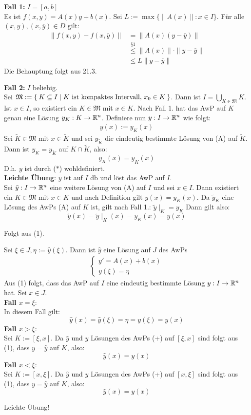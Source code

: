 \documentclass[a4paper,oneside,DIV15,BCOR12mm,chapterprefix=true,headings=onelinechapter]{scrbook}
\begin{document}
\begin{beweise}
\item \textbf{Fall 1:} $I=[a,b]$\\
Es ist $f(x,y)=A(x)y+b(x)$. Sei $L:=\max\{\|A(x)\|:x\in I\}$. Für alle $(x,y),(x,\overline y)\in D$ gilt:
\begin{align*}
\|f(x,y)-f(x,\overline y) \| &=\|A(x)(y-\overline y)\|\\
&\stackrel{\text{§1}}{\le} \|A(x)\|\cdot\|y-\overline y\|\\
&\le L\|y-\overline y\|
\end{align*}
Die Behauptung folgt aus 21.3.

\textbf{Fall 2:} $I$ beliebig.\\
Sei $\mathfrak{M}:=\Set{K\subseteq I | K\text{ ist kompaktes Intervall, } x_0\in K}$.
Dann ist $I=\bigcup_{K\in\mathfrak{M}} K$.\\
Ist $x\in I$, so existiert ein $K\in\mathfrak{M}$ mit $x\in K$. Nach Fall 1. hat das
AwP auf $K$ genau eine Lösung $y_K:K\to\mathbb{R}^n$. Definiere nun $y:I\to\mathbb{R}^n$ wie folgt:
\begin{align}
y(x):=y_K(x)\tag{$*$}
\end{align}
Sei $\tilde K\in\mathfrak{M}$ mit $x\in\tilde K$ und sei $y_{\tilde K}$ die eindeutig
bestimmte Lösung von (A) auf $\tilde K$. Dann ist $y_K=y_{\tilde K}$ auf $K\cap\tilde K$, also:
\[y_K(x)=y_{\tilde K}(x)\]
D.h. $y$ ist durch ($*$) wohldefiniert.\\
\textbf{Leichte Übung}: $y$ ist auf $I$ db und löst das AwP auf $I$.\\
Sei $\tilde y:I\to\mathbb{R}^n$ eine weitere Lösung von (A) auf $I$ und sei $x\in I$.
Dann existiert ein $K\in\mathfrak{M}$ mit $x\in K$ und nach Definition gilt $y(x)=y_K(x)$.
Da $\tilde y_K$ eine Lösung des AwPs (A) auf $K$ ist, gilt nach Fall 1.: $\tilde y\mid_K=y_K$
Dann gilt also:
\[\tilde y(x)=\tilde y\mid_K(x)=y_K(x)=y(x)\]
\item Folgt aus (1).
\item Sei $\xi \in J,\eta:=\hat y(\xi)$. Dann ist $\hat y$ eine Lösung auf $J$ des AwPs
\begin{align*}
\tag{+}
\begin{cases}
y'=A(x)+b(x)\\
y(\xi)=\eta
\end{cases}
\end{align*}
Aus (1) folgt, dass das AwP auf $I$ eine eindeutig bestimmte Lösung $y:I\to\mathbb{R}^n$ hat. Sei $x\in J$.\\
\textbf{Fall $x=\xi$}:\\
In diesem Fall gilt: 
\[\hat y(x)=\hat y(\xi)=\eta=y(\xi)=y(x)\]
\textbf{Fall $x>\xi$}:\\
Sei $K:=[\xi,x]$. Da $\hat y$ und $y$ Lösungen des AwPs (+) auf $[\xi,x]$ sind folgt aus
(1), dass $y=\hat y$ auf $K$, also:
\[\hat y(x)=y(x)\]
\textbf{Fall $x<\xi$}:\\
Sei $K:=[x,\xi]$. Da $\hat y$ und $y$ Lösungen des AwPs (+) auf $[x,\xi]$ sind folgt aus
(1), dass $y=\hat y$ auf $K$, also:
\[\hat y(x)=y(x)\]
\item Leichte Übung!	
\end{beweise}
\end{document}
